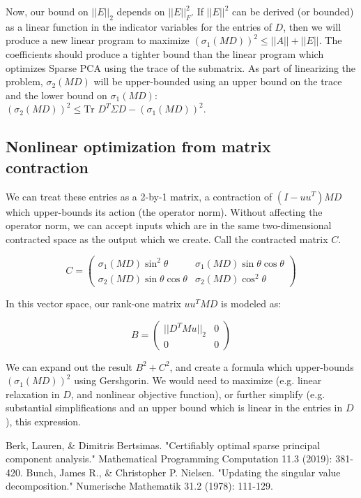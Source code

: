\documentclass{article}
\begin{document}
Now, our bound on $||E||_2$ depends on $||E||_F^2$.
If $||E||^2$ can be derived (or bounded) as a linear function in the indicator variables for the entries of $D$, then we will produce a new linear program to maximize $(\sigma_1(MD))^2 \le ||A|| + ||E||$. The coefficients should produce a tighter bound than the linear program which optimizes Sparse PCA using the trace of the submatrix. As part of linearizing the problem, $\sigma_2(MD)$ will be upper-bounded using an upper bound on the trace and the lower bound on $\sigma_1(MD)$: $(\sigma_2(MD))^2 \le \text{Tr } D^T\Sigma D - (\sigma_1(MD))^2$.

\subsection{Nonlinear optimization from matrix contraction}

We can treat these entries as a 2-by-1 matrix, a contraction of $(I-uu^T)MD$ which upper-bounds its action (the operator norm). Without affecting the operator norm, we can accept inputs which are in the same two-dimensional contracted space as the output which we create. Call the contracted matrix $C$.

$$C =
\left(
    \begin{matrix}
        \sigma_1(MD) \sin^2\theta
        &
        \sigma_1(MD) \sin\theta\cos\theta
        \\
        \sigma_2(MD) \sin\theta\cos\theta
        &
        \sigma_2(MD) \cos^2\theta
    \end{matrix}
\right)
$$

In this vector space, our rank-one matrix $uu^TMD$ is modeled as:

$$B =
\left(
    \begin{matrix}
        ||D^TMu||_2 & 0 \\ 0 & 0
    \end{matrix}
\right)
$$

We can expand out the result $B^2+C^2$, and create a formula which upper-bounds $(\sigma_1(MD))^2$ using Gershgorin. We would need to maximize (e.g. linear relaxation in $D$, and nonlinear objective function), or further simplify (e.g. substantial simplifications and an upper bound which is linear in the entries in $D$), this expression.

\begin{thebibliography}{9}
     Berk, Lauren, \& Dimitris Bertsimas. "Certifiably optimal sparse principal component analysis." Mathematical Programming Computation 11.3 (2019): 381-420.
     Bunch, James R., \& Christopher P. Nielsen. "Updating the singular value decomposition." Numerische Mathematik 31.2 (1978): 111-129.
\end{thebibliography}
\end{document}
